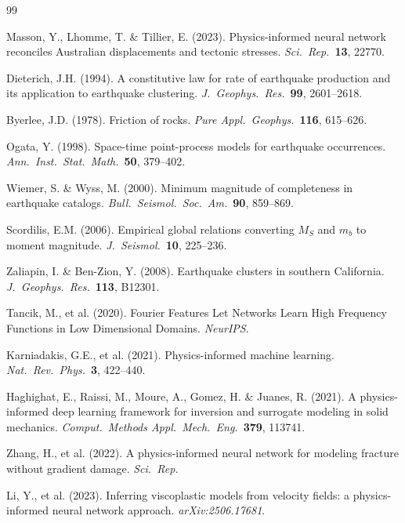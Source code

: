 \documentclass[11pt, a4paper]{article}
\begin{document}
\begin{thebibliography}{99}

Masson, Y., Lhomme, T. \& Tillier, E. (2023). Physics-informed neural network reconciles Australian displacements and tectonic stresses. \textit{Sci.\ Rep.}\ \textbf{13}, 22770.

Dieterich, J.H. (1994). A constitutive law for rate of earthquake production and its application to earthquake clustering. \textit{J.\ Geophys.\ Res.}\ \textbf{99}, 2601--2618.

Byerlee, J.D. (1978). Friction of rocks. \textit{Pure Appl.\ Geophys.}\ \textbf{116}, 615--626.

Ogata, Y. (1998). Space-time point-process models for earthquake occurrences. \textit{Ann.\ Inst.\ Stat.\ Math.}\ \textbf{50}, 379--402.

Wiemer, S. \& Wyss, M. (2000). Minimum magnitude of completeness in earthquake catalogs. \textit{Bull.\ Seismol.\ Soc.\ Am.}\ \textbf{90}, 859--869.

Scordilis, E.M. (2006). Empirical global relations converting $M_S$ and $m_b$ to moment magnitude. \textit{J.\ Seismol.}\ \textbf{10}, 225--236.

Zaliapin, I. \& Ben-Zion, Y. (2008). Earthquake clusters in southern California. \textit{J.\ Geophys.\ Res.}\ \textbf{113}, B12301.

Tancik, M., et al. (2020). Fourier Features Let Networks Learn High Frequency Functions in Low Dimensional Domains. \textit{NeurIPS}.

Karniadakis, G.E., et al. (2021). Physics-informed machine learning. \textit{Nat.\ Rev.\ Phys.}\ \textbf{3}, 422--440.

Haghighat, E., Raissi, M., Moure, A., Gomez, H. \& Juanes, R. (2021). A physics-informed deep learning framework for inversion and surrogate modeling in solid mechanics. \textit{Comput.\ Methods Appl.\ Mech.\ Eng.}\ \textbf{379}, 113741.

Zhang, H., et al. (2022). A physics-informed neural network for modeling fracture without gradient damage. \textit{Sci.\ Rep.}

Li, Y., et al. (2023). Inferring viscoplastic models from velocity fields: a physics-informed neural network approach. \textit{arXiv:2506.17681}.


\end{thebibliography}
\end{document}
